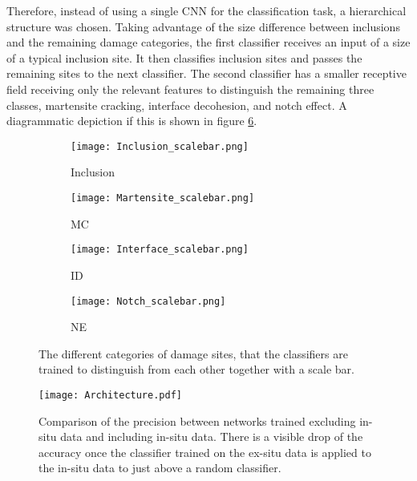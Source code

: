 Therefore, instead of using a single CNN for the classification task, a hierarchical structure was chosen. Taking advantage of the size difference between inclusions and the remaining damage categories, the first classifier receives an input of a size of a typical inclusion site. It then classifies inclusion sites and passes the remaining sites to the next classifier. The second classifier has a smaller receptive field receiving only the relevant features to distinguish the remaining three classes, martensite cracking, interface decohesion, and notch effect. A diagrammatic depiction if this is shown in figure \ref{fig:Architecture}.\\
\begin{figure}
\centering
\begin{subfigure}{.25\textwidth}
\centering
  \texttt{[image: Inclusion\_scalebar.png]}
  \caption{Inclusion}
  \label{fig:Inclusion_scalebar}
\end{subfigure}%
\begin{subfigure}{.25\textwidth}
\centering
  \texttt{[image: Martensite\_scalebar.png]}
  \caption{MC}
  \label{fig:Martensite_scalebar}
\end{subfigure}%
\begin{subfigure}{.25\textwidth}
\centering
  \texttt{[image: Interface\_scalebar.png]}
  \caption{ID}
  \label{fig:Interface_scalebar}
\end{subfigure}%
\begin{subfigure}{.25\textwidth}
\centering
  \texttt{[image: Notch\_scalebar.png]}
  \caption{NE}
  \label{fig:Notch_scalebar}
\end{subfigure}%
\caption{The different categories of damage sites, that the classifiers are trained to distinguish from each other together with a scale bar.}
\label{fig:SizeDifference}
\end{figure}
\begin{figure}
\begin{center}
  \texttt{[image: Architecture.pdf]}
\caption{Comparison of the precision between networks trained excluding in-situ data and including in-situ data. There is a visible drop of the accuracy once the classifier trained on the ex-situ data is applied to the in-situ data to just above a random classifier.}
\label{fig:Architecture}
\end{center}
\end{figure}





